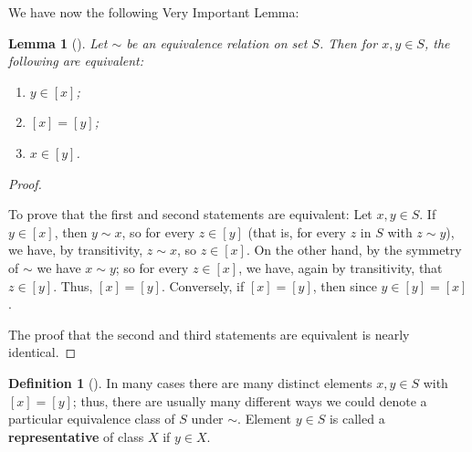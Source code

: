 \documentclass[10pt,openany,oneside]{book}
\newcommand{\terminology}[1]{\textbf{#1}}
\theoremstyle{plain}
\newtheorem{lemma}[theorem]{Lemma}
\theoremstyle{definition}
\newtheorem{definition}[theorem]{Definition}
\theoremstyle{definition}
\theoremstyle{definition}
\theoremstyle{definition}
\numberwithin{equation}{section}
\begin{document}
We have now the following Very Important Lemma:%
\begin{lemma}[{}]\label{vil_lem}
Let \(\sim\) be an equivalence relation on set \(S\). Then for \(x,y\in S\), the following are equivalent: \leavevmode%
\begin{enumerate}
\item\hypertarget{li-399}{}\(y\in [x]\);%
\item\hypertarget{li-400}{}\([x]=[y]\);%
\item\hypertarget{li-401}{}\(x\in [y]\).%
\end{enumerate}
%
\end{lemma}
\begin{proof}\hypertarget{proof-33}{}
To prove that the first and second statements are equivalent: Let \(x, y\in S\). If \(y\in
[x]\), then \(y \sim x\), so for every \(z\in [y]\) (that is, for every \(z\) in \(S\) with \(z\sim y\)), we have, by transitivity, \(z\sim x\), so \(z\in [x]\). On the other hand, by the symmetry of \(\sim\) we have \(x\sim y\); so for every \(z\in [x]\), we have, again by transitivity, that \(z\in [y]\). Thus, \([x]=[y]\). Conversely, if \([x]=[y]\), then since \(y\in [y]=[x]\).%
\par
The proof that the second and third statements are equivalent is nearly identical.%
\end{proof}
\begin{definition}[{}]\label{definition-58}
In many cases there are many distinct elements \(x,y\in S\) with \([x]=[y]\); thus, there are usually many different ways we could denote a particular equivalence class of \(S\) under \(\sim\). Element \(y\in S\) is called a \terminology{representative} of class \(X\) if \(y\in X\).%
\end{definition}
\end{document}
